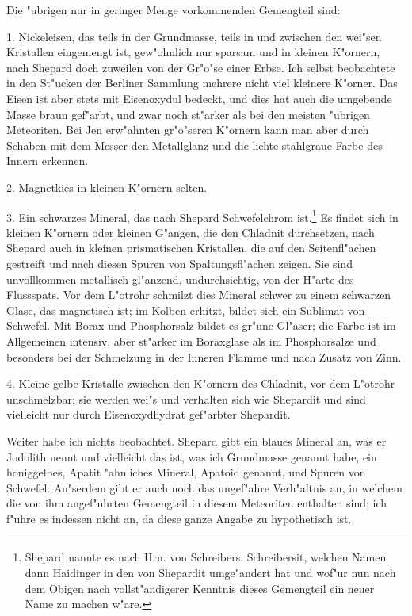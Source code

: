 \documentclass[a4paper, 11pt, oneside]{article}
\begin{document}
Die "ubrigen nur in geringer Menge vorkommenden Gemengteil sind:

1. Nickeleisen, das teils in der Grundmasse, teils in und zwischen den wei"sen Kristallen eingemengt ist, gew"ohnlich nur sparsam und in kleinen K"ornern, nach Shepard doch zuweilen von der Gr"o"se einer Erbse. Ich selbst beobachtete in den St"ucken der Berliner Sammlung mehrere nicht viel kleinere K"orner. Das Eisen ist aber stets mit Eisenoxydul bedeckt, und dies hat auch die umgebende Masse braun gef"arbt, und zwar noch st"arker als bei den meisten "ubrigen Meteoriten. Bei Jen erw"ahnten gr"o"seren K"ornern kann man aber durch Schaben mit dem Messer den Metallglanz und die lichte stahlgraue Farbe des Innern erkennen.

2. Magnetkies in kleinen K"ornern selten.

3. Ein schwarzes Mineral, das nach Shepard Schwefelchrom ist.\footnote{Shepard nannte es nach Hrn. von Schreibers: Schreibersit, welchen Namen dann Haidinger in den von Shepardit umge"andert hat und wof"ur nun nach dem Obigen nach vollst"andigerer Kenntnis dieses Gemengteil ein neuer Name zu machen w"are.} Es findet sich in kleinen K"ornern oder kleinen G"angen, die den Chladnit durchsetzen, nach Shepard auch in kleinen prismatischen Kristallen, die auf den Seitenfl"achen gestreift und nach diesen Spuren von Spaltungsfl"achen zeigen. Sie sind unvollkommen metallisch gl"anzend, undurchsichtig, von der H"arte des Flussspats. Vor dem L"otrohr schmilzt dies Mineral schwer zu einem schwarzen Glase, das magnetisch ist; im Kolben erhitzt, bildet sich ein Sublimat von Schwefel. Mit Borax und Phosphorsalz bildet es gr"une Gl"aser; die Farbe ist im Allgemeinen intensiv, aber st"arker im Boraxglase als im Phosphorsalze und besonders bei der Schmelzung in der Inneren Flamme und nach Zusatz von Zinn.

4. Kleine gelbe Kristalle zwischen den K"ornern des Chladnit, vor dem L"otrohr unschmelzbar; sie werden wei"s und verhalten sich wie Shepardit und sind vielleicht nur durch Eisenoxydhydrat gef"arbter Shepardit.

Weiter habe ich nichts beobachtet. Shepard gibt ein blaues Mineral an, was er Jodolith nennt und vielleicht das ist, was ich Grundmasse genannt habe, ein honiggelbes, Apatit "ahnliches Mineral, Apatoid genannt, und Spuren von Schwefel. Au"serdem gibt er auch noch das ungef"ahre Verh"altnis an, in welchem die von ihm angef"uhrten Gemengteil in diesem Meteoriten enthalten sind; ich f"uhre es indessen nicht an, da diese ganze Angabe zu hypothetisch ist.
\end{document}
